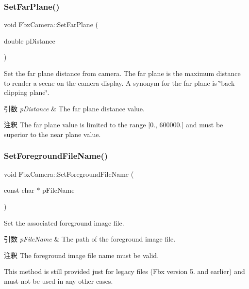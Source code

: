 \subsubsection{\texorpdfstring{Set\+Far\+Plane()}{SetFarPlane()}}
{\footnotesize\ttfamily void Fbx\+Camera\+::\+Set\+Far\+Plane (\begin{DoxyParamCaption}\item[{double}]{p\+Distance }\end{DoxyParamCaption})}

Set the far plane distance from camera. The far plane is the maximum distance to render a scene on the camera display. A synonym for the far plane is \char`\"{}back clipping plane\char`\"{}. 
\begin{DoxyParams}{引数}
{\em p\+Distance} & The far plane distance value. \\
\hline
\end{DoxyParams}
\begin{DoxyRemark}{注釈}
The far plane value is limited to the range \mbox{[}0., 600000.\mbox{]} and must be superior to the near plane value. 
\end{DoxyRemark}
\mbox{\label{class_fbx_camera_abe02de6350eda0abc858e09b994fffb4}} 
\subsubsection{\texorpdfstring{Set\+Foreground\+File\+Name()}{SetForegroundFileName()}}
{\footnotesize\ttfamily void Fbx\+Camera\+::\+Set\+Foreground\+File\+Name (\begin{DoxyParamCaption}\item[{const char $\ast$}]{p\+File\+Name }\end{DoxyParamCaption})}

Set the associated foreground image file. 
\begin{DoxyParams}{引数}
{\em p\+File\+Name} & The path of the foreground image file. \\
\hline
\end{DoxyParams}
\begin{DoxyRemark}{注釈}
The foreground image file name must be valid. 

This method is still provided just for legacy files (Fbx version 5. and earlier) and must not be used in any other cases. 
\end{DoxyRemark}
\mbox{\label{class_fbx_camera_ac6713ad08d35b84585b44855c8be04b9}} 
